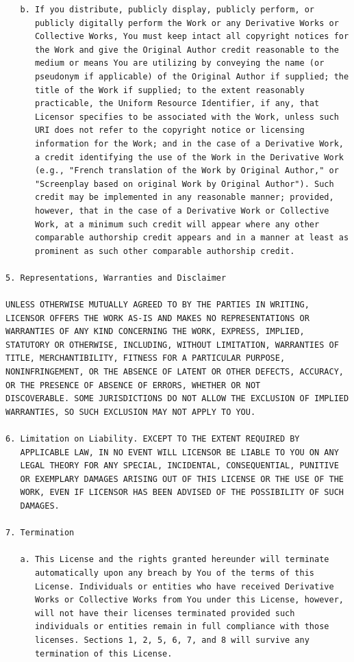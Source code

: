 \begin{verbatim}
   b. If you distribute, publicly display, publicly perform, or
      publicly digitally perform the Work or any Derivative Works or
      Collective Works, You must keep intact all copyright notices for
      the Work and give the Original Author credit reasonable to the
      medium or means You are utilizing by conveying the name (or
      pseudonym if applicable) of the Original Author if supplied; the
      title of the Work if supplied; to the extent reasonably
      practicable, the Uniform Resource Identifier, if any, that
      Licensor specifies to be associated with the Work, unless such
      URI does not refer to the copyright notice or licensing
      information for the Work; and in the case of a Derivative Work,
      a credit identifying the use of the Work in the Derivative Work
      (e.g., "French translation of the Work by Original Author," or
      "Screenplay based on original Work by Original Author"). Such
      credit may be implemented in any reasonable manner; provided,
      however, that in the case of a Derivative Work or Collective
      Work, at a minimum such credit will appear where any other
      comparable authorship credit appears and in a manner at least as
      prominent as such other comparable authorship credit.

5. Representations, Warranties and Disclaimer

UNLESS OTHERWISE MUTUALLY AGREED TO BY THE PARTIES IN WRITING,
LICENSOR OFFERS THE WORK AS-IS AND MAKES NO REPRESENTATIONS OR
WARRANTIES OF ANY KIND CONCERNING THE WORK, EXPRESS, IMPLIED,
STATUTORY OR OTHERWISE, INCLUDING, WITHOUT LIMITATION, WARRANTIES OF
TITLE, MERCHANTIBILITY, FITNESS FOR A PARTICULAR PURPOSE,
NONINFRINGEMENT, OR THE ABSENCE OF LATENT OR OTHER DEFECTS, ACCURACY,
OR THE PRESENCE OF ABSENCE OF ERRORS, WHETHER OR NOT
DISCOVERABLE. SOME JURISDICTIONS DO NOT ALLOW THE EXCLUSION OF IMPLIED
WARRANTIES, SO SUCH EXCLUSION MAY NOT APPLY TO YOU.

6. Limitation on Liability. EXCEPT TO THE EXTENT REQUIRED BY
   APPLICABLE LAW, IN NO EVENT WILL LICENSOR BE LIABLE TO YOU ON ANY
   LEGAL THEORY FOR ANY SPECIAL, INCIDENTAL, CONSEQUENTIAL, PUNITIVE
   OR EXEMPLARY DAMAGES ARISING OUT OF THIS LICENSE OR THE USE OF THE
   WORK, EVEN IF LICENSOR HAS BEEN ADVISED OF THE POSSIBILITY OF SUCH
   DAMAGES.

7. Termination

   a. This License and the rights granted hereunder will terminate
      automatically upon any breach by You of the terms of this
      License. Individuals or entities who have received Derivative
      Works or Collective Works from You under this License, however,
      will not have their licenses terminated provided such
      individuals or entities remain in full compliance with those
      licenses. Sections 1, 2, 5, 6, 7, and 8 will survive any
      termination of this License.


\end{verbatim}
